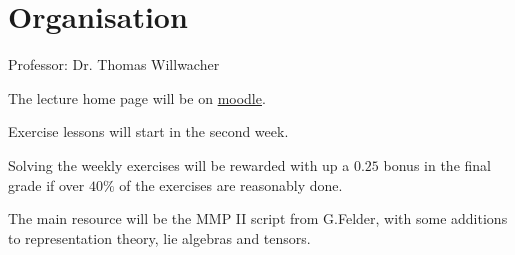 \setcounter{section}{0}
\section*{Organisation}

Professor: Dr. Thomas Willwacher 

The lecture home page will be on \href{https://moodle-app2.let.ethz.ch/course/view.php?id=14801}{moodle}.

Exercise lessons will start in the second week.

Solving the weekly exercises will be rewarded with up a $0.25$ bonus in the final grade if over $40\%$ of the exercises are reasonably done.

The main resource will be the MMP II script from G.Felder, with some additions to representation theory, lie algebras and tensors.




